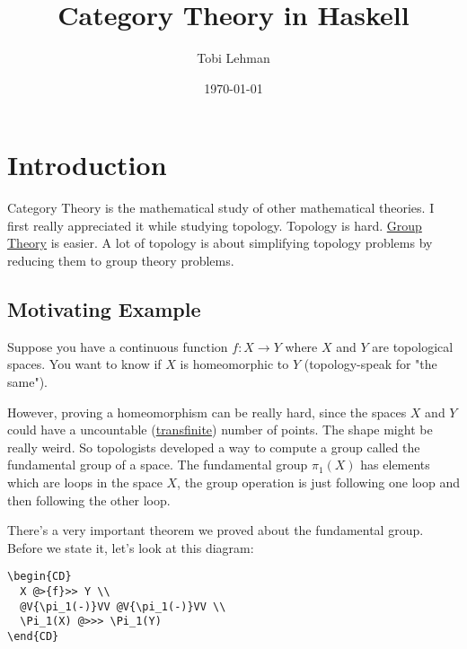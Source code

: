 \documentclass[11pt]{article}
\author{Tobi Lehman}
\date{\today}
\title{Category Theory in Haskell}
\begin{document}
\maketitle
\tableofcontents


\section{Introduction}
\label{sec:org356bc08}

Category Theory is the mathematical study of other mathematical theories.
I first really appreciated it while studying topology. Topology is hard.
\href{../grp/grp-hs.html}{Group Theory} is easier. A lot of topology is about simplifying topology problems
by reducing them to group theory problems.

\subsection{Motivating Example}
\label{sec:org535e7af}

Suppose you have a continuous function \(f : X \to Y\) where
\(X\) and \(Y\) are topological spaces. You want to know if \(X\) is
homeomorphic to \(Y\) (topology-speak for "the same").

However, proving a homeomorphism can be really hard, since the spaces \(X\) and \(Y\)
could have a uncountable (\href{https://tobilehman.com/archive/tlehman.blog/p/transfinite-numbers.html}{transfinite}) number of points. The shape might be really weird.
So topologists developed a way to compute a group called the fundamental group of a
space. The fundamental group \(\pi_1(X)\) has elements which are loops in the space \(X\),
the group operation is just following one loop and then following the other loop.

There's a very important theorem we proved about the fundamental group. Before we state it,
let's look at this diagram:

\begin{verbatim}
\begin{CD}
  X @>{f}>> Y \\
  @V{\pi_1(-)}VV @V{\pi_1(-)}VV \\
  \Pi_1(X) @>>> \Pi_1(Y)
\end{CD}
\end{verbatim}
\end{document}
